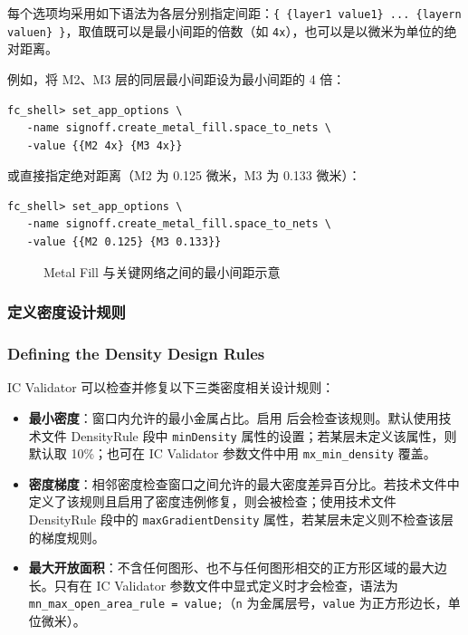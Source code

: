 每个选项均采用如下语法为各层分别指定间距：\texttt{\{ \{layer1 value1\} ... \{layern valuen\} \}}，取值既可以是最小间距的倍数（如 \texttt{4x}），也可以是以微米为单位的绝对距离。

例如，将 M2、M3 层的同层最小间距设为最小间距的 4 倍：
\begin{lstlisting}
fc_shell> set_app_options \
   -name signoff.create_metal_fill.space_to_nets \
   -value {{M2 4x} {M3 4x}}
\end{lstlisting}

或直接指定绝对距离（M2 为 0.125 微米，M3 为 0.133 微米）：
\begin{lstlisting}
fc_shell> set_app_options \
   -name signoff.create_metal_fill.space_to_nets \
   -value {{M2 0.125} {M3 0.133}}
\end{lstlisting}

\begin{figure}[htbp]
\centering
{}
\caption{Metal Fill 与关键网络之间的最小间距示意}
\label{fig:fill-net-spacing}
\end{figure}

\subsubsection{定义密度设计规则}
\subsubsection*{Defining the Density Design Rules}

IC Validator 可以检查并修复以下三类密度相关设计规则：
\begin{itemize}
  \item \textbf{最小密度}：窗口内允许的最小金属占比。启用  后会检查该规则。默认使用技术文件 DensityRule 段中 \texttt{minDensity} 属性的设置；若某层未定义该属性，则默认取 10\%；也可在 IC Validator 参数文件中用 \texttt{mx\_min\_density} 覆盖。
  \item \textbf{密度梯度}：相邻密度检查窗口之间允许的最大密度差异百分比。若技术文件中定义了该规则且启用了密度违例修复，则会被检查；使用技术文件 DensityRule 段中的 \texttt{maxGradientDensity} 属性，若某层未定义则不检查该层的梯度规则。
  \item \textbf{最大开放面积}：不含任何图形、也不与任何图形相交的正方形区域的最大边长。只有在 IC Validator 参数文件中显式定义时才会检查，语法为 \texttt{mn\_max\_open\_area\_rule = value;}（\texttt{n} 为金属层号，\texttt{value} 为正方形边长，单位微米）。
\end{itemize}

